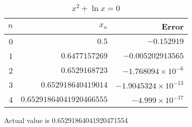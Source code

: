 \documentclass[letterpaper, landscape]{exam}
\begin{document}
\begin{enumerate}
      \begin{table}[H]
        \centering
        \begin{tabular}{rrr}
          \toprule
          $n$ & $x_n$                    & Error \\
          \midrule
          0   & $0.5$                    & $-0.152919$ \\
          1   & $0.6477157269$           & $-0.005202913565$ \\
          2   & $0.6529168723$           & $-1.768094 \times 10^{-6}$\\
          3   & $0.652918640419014$      & $-1.9045324 \times 10^{-13}$ \\
          4   & $0.65291864041920466555$ & $-4.999 \times 10^{-17}$ \\
          \bottomrule
        \end{tabular}
        \caption{$x^2 + \ln x = 0$}
      \end{table}

      Actual value is 0.65291864041920471554 

  \end{enumerate}

  

  
\end{document}
